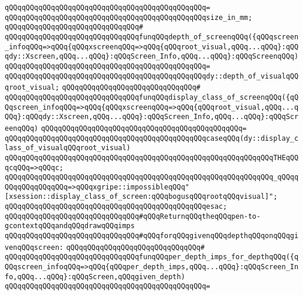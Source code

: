 \verb|qQQqqQQqqQQqqQQqqQQqqQQqqQQqqQQqqQQqqQQqqQQqqQQq=|\newline
\verb|qQQqqQQqqQQqqQQqqQQqqQQqqQQqqQQqqQQqqQQqqQQqqQQqsize_in_mm;|\newline
\verb|qQQqqQQqqQQqqQQqqQQqqQQqqQQqqQQq#|\newline
\verb|qQQqqQQqqQQqqQQqqQQqqQQqqQQqqQQqfunqQQqdepth_of_screenqQQq({qQQqscreen_infoqQQq=>qQQq{qQQqxscreenqQQq=>qQQq{qQQqroot_visual,qQQq...qQQq}:qQQqdy::Xscreen,qQQq...qQQq}:qQQqScreen_Info,qQQq...qQQq}:qQQqScreenqQQq)|\newline
\verb|qQQqqQQqqQQqqQQqqQQqqQQqqQQqqQQqqQQqqQQqqQQqqQQq=|\newline
\verb|qQQqqQQqqQQqqQQqqQQqqQQqqQQqqQQqqQQqqQQqqQQqqQQqdy::depth_of_visualqQQqroot_visual;|\newline
\verb|qQQqqQQqqQQqqQQqqQQqqQQqqQQqqQQq#|\newline
\verb|qQQqqQQqqQQqqQQqqQQqqQQqqQQqqQQqfunqQQqdisplay_class_of_screenqQQq({qQQqscreen_infoqQQq=>qQQq{qQQqxscreenqQQq=>qQQq{qQQqroot_visual,qQQq...qQQq}:qQQqdy::Xscreen,qQQq...qQQq}:qQQqScreen_Info,qQQq...qQQq}:qQQqScreenqQQq)|\newline
\verb|qQQqqQQqqQQqqQQqqQQqqQQqqQQqqQQqqQQqqQQqqQQqqQQq=|\newline
\verb|qQQqqQQqqQQqqQQqqQQqqQQqqQQqqQQqqQQqqQQqqQQqqQQqcaseqQQq(dy::display_class_of_visualqQQqroot_visual)|\newline
\verb|qQQqqQQqqQQqqQQqqQQqqQQqqQQqqQQqqQQqqQQqqQQqqQQqqQQqqQQqqQQqqQQqTHEqQQqcqQQq=>qQQqc;|\newline
\verb|qQQqqQQqqQQqqQQqqQQqqQQqqQQqqQQqqQQqqQQqqQQqqQQqqQQqqQQqqQQqqQQq_qQQqqQQqqQQqqQQqqQQq=>qQQqxgripe::impossibleqQQq"[xsession::display_class_of_screen:qQQqbogusqQQqrootqQQqvisual]";|\newline
\verb|qQQqqQQqqQQqqQQqqQQqqQQqqQQqqQQqqQQqqQQqqQQqqQQqesac;|\newline
\newline
\verb|qQQqqQQqqQQqqQQqqQQqqQQqqQQqqQQq#qQQqReturnqQQqtheqQQqpen-to-gcontextqQQqandqQQqdrawqQQqimps|\newline
\verb|qQQqqQQqqQQqqQQqqQQqqQQqqQQqqQQq#qQQqforqQQqgivenqQQqdepthqQQqonqQQqgivenqQQqscreen:|\newline
\verb|qQQqqQQqqQQqqQQqqQQqqQQqqQQqqQQq#|\newline
\verb|qQQqqQQqqQQqqQQqqQQqqQQqqQQqqQQqfunqQQqper_depth_imps_for_depthqQQq({qQQqscreen_infoqQQq=>qQQq{qQQqper_depth_imps,qQQq...qQQq}:qQQqScreen_Info,qQQq...qQQq}:qQQqScreen,qQQqgiven_depth)|\newline
\verb|qQQqqQQqqQQqqQQqqQQqqQQqqQQqqQQqqQQqqQQqqQQqqQQq=|\newline

